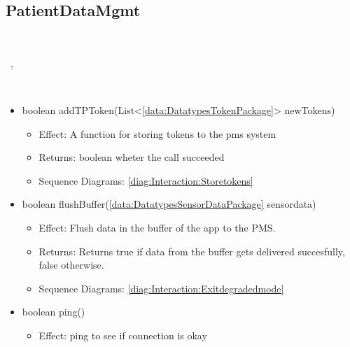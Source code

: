   \subsection{PatientDataMgmt}\label{int:InterfacesPatientDataMgmt}
    \begin{description}
      \item[Provided by:] \iconcomponent{}~
      \item[Required by:] \iconcomponent{}~, \iconcomponent{}~ 
      \item[Operations:] ~
    \begin{itemize}[noitemsep,nolistsep,leftmargin=-.25cm]
      \item \textsf{boolean addTPToken(List\textless{}\ref{data:DatatypesTokenPackage}\textgreater{} newTokens)}
        \begin{itemize}[noitemsep,nolistsep]
           \item Effect: A function for storing tokens to the pms system 
           \item Returns: boolean wheter the call succeeded
           \item Sequence Diagrams: \cref{diag:Interaction:Storetokens}
        \end{itemize}
      \item \textsf{boolean flushBuffer(\ref{data:DatatypesSensorDataPackage} sensordata)}
        \begin{itemize}[noitemsep,nolistsep]
           \item Effect: Flush data in the buffer of the app to the PMS. 
           \item Returns: Returns true if data from the buffer gets delivered succesfully, false otherwise.
           \item Sequence Diagrams: \cref{diag:Interaction:Exitdegradedmode}
        \end{itemize}
      \item \textsf{boolean ping()}
        \begin{itemize}[noitemsep,nolistsep]
           \item Effect: ping to see if connection is okay
 

\end{itemize}
\end{itemize}
\end{description}
